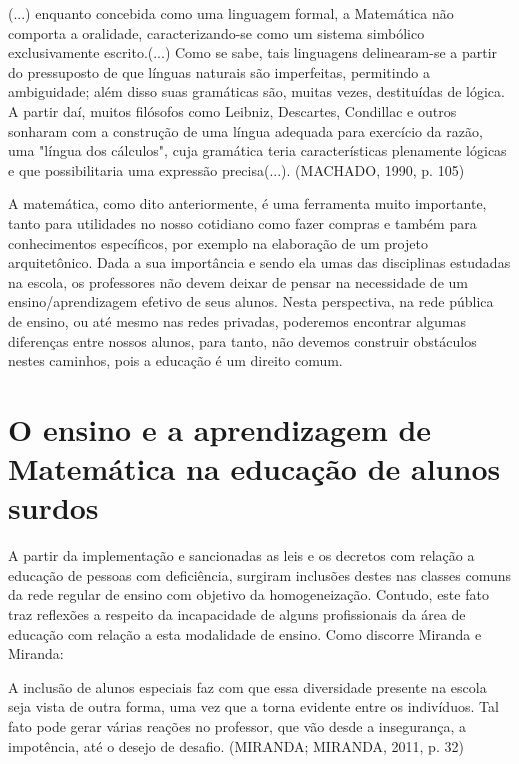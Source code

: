 \documentclass[brasil]{abnt}
\begin{document}
		\begin{citacao}(...) enquanto concebida como uma linguagem formal, a Matemática não comporta a oralidade, caracterizando-se como um sistema simbólico exclusivamente escrito.(...) 
						Como se sabe, tais linguagens delinearam-se a partir do pressuposto de que línguas naturais são imperfeitas, permitindo a ambiguidade; além disso suas gramáticas são, muitas vezes, 
						destituídas de lógica. A partir daí, muitos filósofos como Leibniz, Descartes, Condillac e outros sonharam com a construção de uma língua adequada para exercício da razão, uma "língua 
						dos cálculos", cuja gramática teria características plenamente lógicas e que possibilitaria uma expressão precisa(...). (MACHADO, 1990, p. 105)
		\end{citacao}
		
	A matemática, como dito anteriormente, é uma ferramenta muito importante, tanto para utilidades no nosso cotidiano como fazer compras e também para conhecimentos específicos, por exemplo na elaboração 
	de um projeto arquitetônico. Dada a sua importância e sendo ela umas das disciplinas estudadas na escola, os professores não devem deixar de pensar na necessidade de um ensino/aprendizagem 
	efetivo de seus alunos. Nesta perspectiva, na rede pública de ensino, ou até mesmo nas redes privadas, poderemos encontrar algumas diferenças entre nossos alunos, para tanto, não devemos construir
	obstáculos nestes caminhos, pois a educação é um direito comum. 
	
 
	\section{O ensino e a aprendizagem de Matemática na educação de alunos surdos}	
	A partir da implementação e sancionadas as leis e os decretos com relação a educação de pessoas com deficiência, surgiram inclusões destes nas classes comuns da rede regular de ensino com objetivo da 
	homogeneização. Contudo, este fato traz reflexões a respeito da incapacidade de alguns profissionais da área de educação com relação a esta modalidade de ensino. Como discorre Miranda e Miranda:
		                 
			\begin{citacao} A inclusão de alunos especiais faz com que essa diversidade presente na escola seja vista de outra forma, uma vez que a torna evidente entre os indivíduos. Tal fato pode gerar 
							várias reações no professor, que vão desde a insegurança, a impotência, até o desejo de desafio. (MIRANDA; MIRANDA, 2011, p. 32)   			
			\end{citacao}
						
\end{document}
